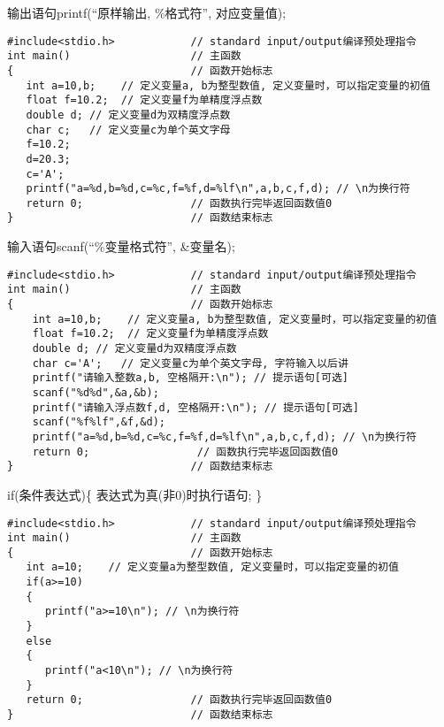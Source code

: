 \begin{frame}[fragile]{输出语句printf(``原样输出, \%格式符'', 对应变量值);}
\begin{lstlisting}
#include<stdio.h>            // standard input/output编译预处理指令
int main()                   // 主函数
{                            // 函数开始标志
   int a=10,b;    // 定义变量a, b为整型数值, 定义变量时，可以指定变量的初值
   float f=10.2;  // 定义变量f为单精度浮点数
   double d; // 定义变量d为双精度浮点数
   char c;   // 定义变量c为单个英文字母
   f=10.2;
   d=20.3;
   c='A';
   printf("a=%d,b=%d,c=%c,f=%f,d=%lf\n",a,b,c,f,d); // \n为换行符
   return 0;                 // 函数执行完毕返回函数值0
}                            // 函数结束标志
\end{lstlisting}
\end{frame}

\begin{frame}[fragile]{输入语句scanf(``\%变量格式符'', \&变量名);}
\begin{lstlisting}
#include<stdio.h>            // standard input/output编译预处理指令
int main()                   // 主函数
{                            // 函数开始标志
    int a=10,b;    // 定义变量a, b为整型数值, 定义变量时，可以指定变量的初值
    float f=10.2;  // 定义变量f为单精度浮点数
    double d; // 定义变量d为双精度浮点数
    char c='A';   // 定义变量c为单个英文字母, 字符输入以后讲
    printf("请输入整数a,b, 空格隔开:\n"); // 提示语句[可选]
    scanf("%d%d",&a,&b);
    printf("请输入浮点数f,d, 空格隔开:\n"); // 提示语句[可选]
    scanf("%f%lf",&f,&d);
    printf("a=%d,b=%d,c=%c,f=%f,d=%lf\n",a,b,c,f,d); // \n为换行符
    return 0;                 // 函数执行完毕返回函数值0
}                            // 函数结束标志
\end{lstlisting}
\end{frame}

\begin{frame}[fragile]{if(条件表达式)\{ 表达式为真(非0)时执行语句; \}}
\begin{lstlisting}
#include<stdio.h>            // standard input/output编译预处理指令
int main()                   // 主函数
{                            // 函数开始标志
   int a=10;    // 定义变量a为整型数值, 定义变量时，可以指定变量的初值
   if(a>=10)
   {
      printf("a>=10\n"); // \n为换行符
   }
   else
   {
      printf("a<10\n"); // \n为换行符
   }
   return 0;                 // 函数执行完毕返回函数值0
}                            // 函数结束标志
\end{lstlisting}
\end{frame}

